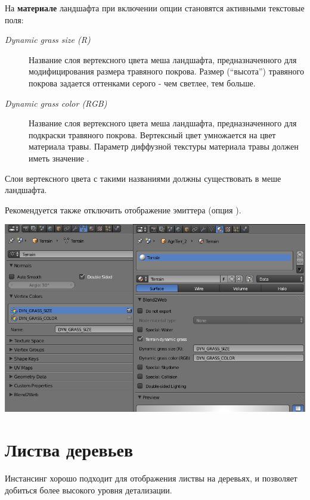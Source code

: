 \documentclass[a4paper,12pt,oneside]{sphinxmanual}
\begin{document}
На \textbf{материале} ландшафта при включении опции  становятся активными текстовые поля:
\begin{description}
\item[{\emph{Dynamic grass size (R)}}] \leavevmode
Название слоя вертексного цвета меша ландшафта, предназначенного для модифицирования размера травяного покрова. Размер (``высота'') травяного покрова задается оттенками серого - чем светлее, тем больше.

\item[{\emph{Dynamic grass color (RGB)}}] \leavevmode
Название слоя вертексного цвета меша ландшафта, предназначенного для подкраски травяного покрова. Вертексный цвет умножается на цвет материала травы. Параметр  диффузной текстуры материала травы должен иметь значение .

\end{description}

Слои вертексного цвета с такими названиями должны существовать в меше ландшафта.

Рекомендуется также отключить отображение эмиттера (опция ).

{\hfill\includegraphics[width=1.000\linewidth]{dynamic_grass_setup.jpg}\hfill}


\section{Листва деревьев}
\label{particles_instancing:particles-leaves}\label{particles_instancing:id4}
Инстансинг хорошо подходит для отображения листвы на деревьях, и позволяет добиться более высокого уровня детализации.
\end{document}
